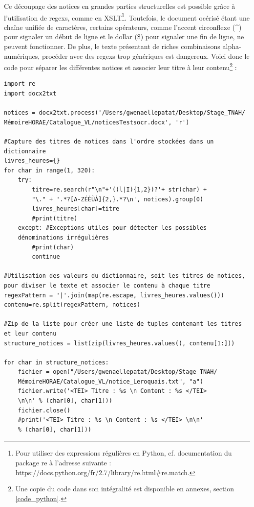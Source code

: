 \documentclass[a4paper,12pt,twoside]{book}
\begin{document}
Ce découpage des notices en grandes parties structurelles est possible grâce à l'utilisation de regexs, comme en XSLT\footnote{Pour utiliser des expressions régulières en Python, cf. documentation du package re à l'adresse suivante : https://docs.python.org/fr/2.7/library/re.html#re.match.}. Toutefois, le document océrisé étant une chaîne unifiée de caractères, certains opérateurs, comme l'accent circonflexe (\og \^ \fg{}) pour signaler un début de ligne et le dollar (\og \$\fg{}) pour signaler une fin de ligne, ne peuvent fonctionner. De plus, le texte présentant de riches combinaisons alpha-numériques, procéder avec des regexs trop génériques est dangereux. Voici donc le code pour séparer les différentes notices et associer leur titre à leur contenu\footnote{Une copie du code dans son intégralité est disponible en annexes, section \ref{code_python}.} : 
\begin{verbatim}
import re
import docx2txt

notices = docx2txt.process('/Users/gwenaellepatat/Desktop/Stage_TNAH/
MémoireHORAE/Catalogue_VL/noticesTestsocr.docx', 'r')
 
#Capture des titres de notices dans l'ordre stockées dans un dictionnaire
livres_heures={}
for char in range(1, 320):
    try:
        titre=re.search(r"\n"+'((l|I){1,2})?'+ str(char) + 
        "\." + '.*?[A-ZÉÈÙÀ]{2,}.*?\n', notices).group(0)
        livres_heures[char]=titre
        #print(titre)
    except: #Exceptions utiles pour détecter les possibles 
    dénominations irrégulières
        #print(char)
        continue
        
#Utilisation des valeurs du dictionnaire, soit les titres de notices, 
pour diviser le texte et associer le contenu à chaque titre
regexPattern = '|'.join(map(re.escape, livres_heures.values()))
contenu=re.split(regexPattern, notices)
 
#Zip de la liste pour créer une liste de tuples contenant les titres 
et leur contenu
structure_notices = list(zip(livres_heures.values(), contenu[1:]))
 
for char in structure_notices:
    fichier = open("/Users/gwenaellepatat/Desktop/Stage_TNAH/
    MémoireHORAE/Catalogue_VL/notice_Leroquais.txt", "a")
    fichier.write('<TEI> Titre : %s \n Content : %s </TEI> 
    \n\n' % (char[0], char[1]))
    fichier.close()
    #print('<TEI> Titre : %s \n Content : %s </TEI> \n\n' 
    % (char[0], char[1]))
\end{verbatim}
\end{document}
